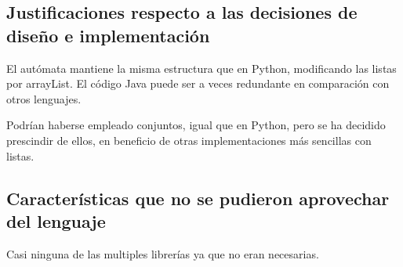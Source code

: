 \documentclass[12pt,a4paper]{article}
\begin{document}
\subsection{Justificaciones respecto a las decisiones de diseño e 
implementación}
El autómata mantiene la misma estructura que en Python, modificando las listas 
por arrayList. El código Java puede ser a veces redundante en comparación con 
otros lenguajes.

Podrían haberse empleado conjuntos, igual que en Python, pero se ha decidido 
prescindir de ellos, en beneficio de otras implementaciones más sencillas con 
listas.


\subsection{Características que no se pudieron aprovechar del lenguaje}
Casi ninguna de las multiples librerías ya que no eran necesarias.
\end{document}
